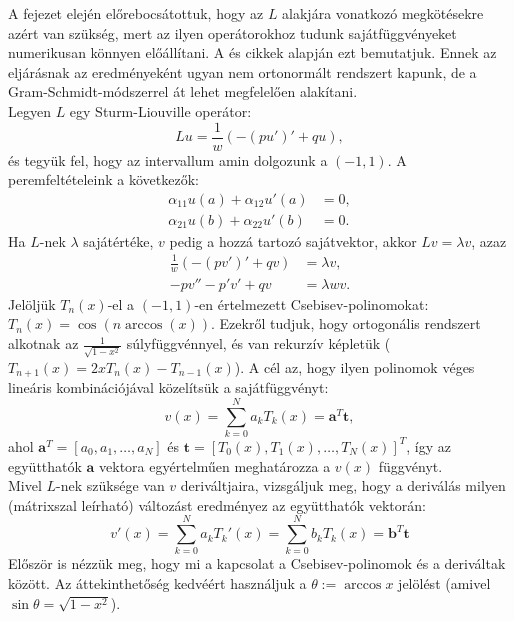 \documentclass[oneside, titlepage, 12pt, a4paper]{report}
\begin{document}
A fejezet elején előrebocsátottuk, hogy az $L$ alakjára vonatkozó megkötésekre azért van szükség, mert az ilyen operátorokhoz tudunk sajátfüggvényeket numerikusan könnyen előállítani. A  \cite{ChebysevTau} és \cite{LISC} cikkek alapján ezt bemutatjuk. Ennek az eljárásnak az eredményeként ugyan nem ortonormált rendszert kapunk, de a Gram-Schmidt-módszerrel át lehet megfelelően alakítani. \\
Legyen $L$ egy Sturm-Liouville operátor:
\begin{equation*}
L u = \frac{1}{w} ( -(p u')' + q u),
\end{equation*}
és tegyük fel, hogy az intervallum amin dolgozunk a $(-1, 1)$. A peremfeltételeink a következők:
\begin{align*}
\alpha_{11}u(a) + \alpha_{12}u'(a) &= 0, \\
\alpha_{21}u(b) + \alpha_{22}u'(b) &= 0.
\end{align*}
Ha $L$-nek $\lambda$ sajátértéke, $v$ pedig a hozzá tartozó sajátvektor, akkor $L v = \lambda v$, azaz
\begin{align}
\frac{1}{w} ( -(p v')' + q v) &= \lambda v, \nonumber \\
-p v'' - p' v' + q v &= \lambda w v. \label{eq:CT:2}
\end{align}
Jelöljük $T_n(x)$-el a $(-1, 1)$-en értelmezett Csebisev-polinomokat: $T_n(x) = \cos(n \arccos(x))$. Ezekről tudjuk, hogy ortogonális rendszert alkotnak az $\frac{1}{\sqrt{1 - x^2}}$ súlyfüggvénnyel, és van rekurzív képletük ($T_{n+1}(x) = 2xT_n(x) - T_{n-1}(x)$). A cél az, hogy ilyen polinomok véges lineáris kombinációjával közelítsük a sajátfüggvényt:
\begin{equation*}
v(x) = \sum_{k = 0}^N a_k T_k(x) = \mathbf{a}^T \mathbf{t},
\end{equation*}
ahol $\mathbf{a}^T = [a_0, a_1, \dots, a_N]$ és $\mathbf{t} = [T_0(x), T_1(x), \dots, T_N(x)]^T$, így az együtthatók $\mathbf{a}$ vektora egyértelműen meghatározza a $v(x)$ függvényt. \\
Mivel $L$-nek szüksége van $v$ deriváltjaira, vizsgáljuk meg, hogy a deriválás milyen (mátrixszal leírható) változást eredményez az együtthatók vektorán:
\begin{equation}
v'(x) = \sum_{k = 0}^N a_k T_k'(x) = \sum_{k = 0}^N b_k T_k(x) = \mathbf{b}^T \mathbf{t} \label{eq:CT:1}
\end{equation}
Először is nézzük meg, hogy mi a kapcsolat a Csebisev-polinomok és a deriváltak között. Az áttekinthetőség kedvéért használjuk a $\theta := \arccos x$ jelölést (amivel $\sin \theta = \sqrt{1 - x^2}$).
\end{document}
